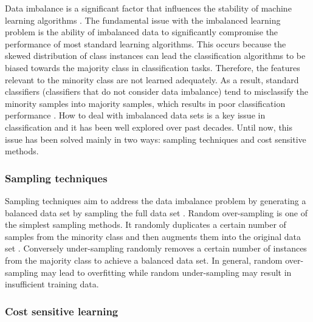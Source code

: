 \documentclass[preprint,12pt,authoryear]{elsarticle}
\begin{document}
Data imbalance is a significant factor that influences the stability of machine learning algorithms \citep{Chawla2010}. The fundamental issue with the imbalanced learning problem is the ability of imbalanced data to significantly compromise the performance of most standard learning algorithms.
This occurs because the skewed distribution of class instances can lead the classification algorithms to be biased towards the majority class in classification tasks. Therefore, the features relevant to the minority class are not learned adequately. As a result, standard classifiers (classifiers that do not consider data imbalance) tend to misclassify the minority samples into majority samples, which results in poor classification performance \citep{Wang2016}.  How to deal with imbalanced data sets is a key issue in classification and it has been well explored over past decades. Until now, this issue has been solved mainly in two ways: sampling techniques and cost sensitive methods.

\subsubsection{Sampling techniques}

Sampling techniques aim to address the data imbalance problem by generating a balanced data set by sampling the full data set
\citep{Estabrooks2004}. Random over-sampling is one of the simplest sampling methods. It randomly duplicates a certain number of samples from the minority class and then augments them into the original data set \citep{Han2005}. Conversely under-sampling randomly removes a certain number of instances from the majority class to achieve a balanced data set. In general, random over-sampling may lead to overfitting while random under-sampling may result in insufficient training data.



\subsubsection{Cost sensitive learning}
\end{document}
